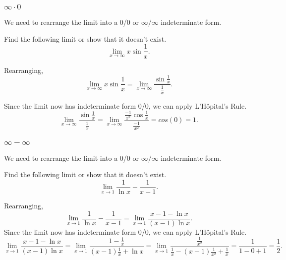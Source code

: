 \subsubsection{$\infty\cdot 0$}
We need to rearrange the limit into a 0/0 or $\infty/\infty$ indeterminate form.
\begin{example}
	Find the following limit or show that it doesn't exist.
	\begin{equation*}
		\lim_{x\to\infty}{x\sin{\frac{1}{x}}}.
	\end{equation*}
\end{example}
\begin{answer}
	Rearranging,
	\begin{equation*}
		\lim_{x\to\infty}{x\sin{\frac{1}{x}}} = \lim_{x\to\infty}\frac{\sin{\frac{1}{x}}}{\frac{1}{x}}.
	\end{equation*}
	
	Since the limit now has indeterminate form 0/0, we can apply L'H\^{o}pital's Rule.
	\begin{equation*}
		\lim_{x\to\infty}\frac{\sin{\frac{1}{x}}}{\frac{1}{x}} = \lim_{x\to\infty}\frac{\frac{-1}{x^2}\cos{\frac{1}{x}}}{\frac{-1}{x^2}} = cos(0) = 1.
	\end{equation*}
\end{answer}

\subsubsection{$\infty - \infty$}
We need to rearrange the limit into a 0/0 or $\infty/\infty$ indeterminate form.
\begin{example}
	Find the following limit or show that it doesn't exist.
	\begin{equation*}
		\lim_{x\to 1}{\frac{1}{\ln{x}} - \frac{1}{x-1}}.
	\end{equation*}
\end{example}
\begin{answer}
	Rearranging,
	\begin{equation*}
		\lim_{x\to 1}{\frac{1}{\ln{x}} - \frac{1}{x-1}} = \lim_{x\to 1}{\frac{x-1-\ln{x}}{(x-1)\ln{x}}}.
	\end{equation*}
	Since the limit now has indeterminate form 0/0, we can apply L'H\^{o}pital's Rule.
	\begin{equation*}
		\lim_{x\to 1}{\frac{x-1-\ln{x}}{(x-1)\ln{x}}} = \lim_{x\to 1}{\frac{1-\frac{1}{x}}{(x-1)\frac{1}{x} + \ln{x}}} = \lim_{x\to 1}{\frac{\frac{1}{x^2}}{\frac{1}{x} - (x-1)\frac{1}{x^2} + \frac{1}{x}}} = \frac{1}{1-0+1} = \frac{1}{2}.
	\end{equation*}
\end{answer}

